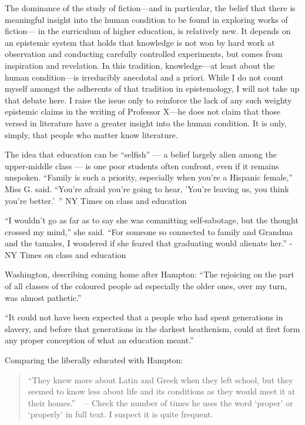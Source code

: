 The dominance of the study of fiction---and in particular, the belief that there is meaningful insight into the human condition to be found in exploring works of fiction--- in the curriculum of higher education, is relatively new. It depends on an epistemic system that holds that knowledge is not won by hard work at observation and conducting carefully controlled experiments, but comes from inspiration and revelation. In this tradition, knowledge---at least about the human condition---is irreducibly anecdotal and a priori.
While I do not count myself amongst the adherents of that tradition in epistemology, I will not take up that debate here. I raise the issue only to reinforce the lack of any such weighty epistemic claims in the writing of Professor X---he does not claim that those versed in literature have a greater insight into the human condition. It is only, simply, that people who matter know literature.

The idea that education can be ``selfish'' --- a belief largely alien among the upper-middle class --- is one poor students often confront, even if it remains unspoken. ``Family is such a priority, especially when you're a Hispanic female,'' Miss G. said. ``You're afraid you're going to hear, 'You're leaving us, you think you're better.' ''
NY Times on class and education

``I wouldn't go as far as to say she was committing self-sabotage, but the thought crossed my mind,'' she said. ``For someone so connected to family and Grandma and the tamales, I wondered if she feared that graduating would alienate her.'' -NY Times on class and education

Washington, describing coming home after Hampton: ``The rejoicing on the part of all classes of the coloured people ad especially the older ones, over my turn, was almost pathetic.'' ~\citep[p. 40]{Washington:1952uf}

``It could not have been expected that a people who had spent generations in slavery, and before that generations in the darkest heathenism, could at first form any proper conception of what an education meant.'' ~\citep[p. 47]{Washington:1952uf}

Comparing the liberally educated with Hampton:

\begin{quote}

``They knew more about Latin and Greek when they left school, but they seemed to know less about life and its conditions as they would meet it at their homes.'' ~\citep[P. 51--52]{Washington:1952uf}
-- Check the number of times he uses the word `proper' or `properly' in full text. I suspect it is quite frequent.
\end{quote}

